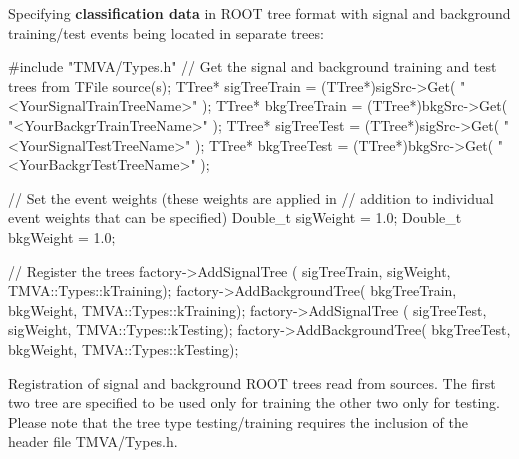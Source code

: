 Specifying {\bf classification data} in ROOT tree format with signal 
and background training/test events being located in separate trees:
\begin{codeexample}
\begin{tmvacode}
#include "TMVA/Types.h"
// Get the signal and background training and test trees from TFile source(s); 
TTree* sigTreeTrain = (TTree*)sigSrc->Get( "<YourSignalTrainTreeName>"   );
TTree* bkgTreeTrain = (TTree*)bkgSrc->Get( "<YourBackgrTrainTreeName>" );
TTree* sigTreeTest  = (TTree*)sigSrc->Get( "<YourSignalTestTreeName>" );
TTree* bkgTreeTest  = (TTree*)bkgSrc->Get( "<YourBackgrTestTreeName>" );

// Set the event weights (these weights are applied in 
// addition to individual event weights that can be specified)
Double_t sigWeight  = 1.0; 
Double_t bkgWeight = 1.0;

// Register the trees
factory->AddSignalTree    ( sigTreeTrain, sigWeight, TMVA::Types::kTraining);
factory->AddBackgroundTree( bkgTreeTrain, bkgWeight, TMVA::Types::kTraining);
factory->AddSignalTree    ( sigTreeTest,  sigWeight, TMVA::Types::kTesting);
factory->AddBackgroundTree( bkgTreeTest,  bkgWeight, TMVA::Types::kTesting);
\end{tmvacode}
\caption[.]{\codeexampleCaptionSize Registration of signal and background ROOT trees
            read from  sources.
            The first two tree are specified to be used only for training the other two only for testing. Please note that the tree type testing/training requires the inclusion of the header file TMVA/Types.h.}
\end{codeexample}

